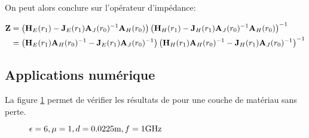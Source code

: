 
        On peut alors conclure sur l'opérateur d'impédance:

        \begin{align}
            \mathbf{Z} &= 
            \left(\mathbf{H}_{E}(r_1) - \mathbf{J}_{E}(r_1)\mathbf{A}_{J}(r_0)^{-1}\mathbf{A}_{H}(r_0)\right)
            \left(\mathbf{H}_{H}(r_1) - \mathbf{J}_{H}(r_1)\mathbf{A}_{J}(r_0)^{-1}\mathbf{A}_{H}(r_0)\right)^{-1}
            \\
            &=
            \left(\mathbf{H}_{E}(r_1)\mathbf{A}_{H}(r_0)^{-1} - \mathbf{J}_{E}(r_1)\mathbf{A}_{J}(r_0)^{-1}\right)
            \left(\mathbf{H}_{H}(r_1)\mathbf{A}_{H}(r_0)^{-1} - \mathbf{J}_{H}(r_1)\mathbf{A}_{J}(r_0)^{-1}\right)^{-1}
        \end{align}


    \subsection{Applications numérique}

        La figure \ref{fig:imp_fourier:cylindre:hoppe} permet de vérifier les résultats de \cite[p.~62]{hoppe_impedance_1995} pour une couche de matériau sans perte.


        \begin{figure}[!hbt]
            \centering
            \caption{$\epsilon = 6, \mu = 1, d=0.0225\text{m}, f=1\text{GHz}$}
            \label{fig:imp_fourier:cylindre:hoppe}
        \end{figure}

